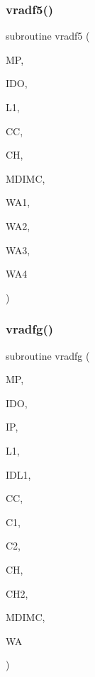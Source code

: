 \mbox{\label{sfft_8f_a0aec689c9487c752ec61e9d3692b2c12}} 
\subsubsection{\texorpdfstring{vradf5()}{vradf5()}}
{\footnotesize\ttfamily subroutine vradf5 (\begin{DoxyParamCaption}\item[{}]{MP,  }\item[{}]{I\+DO,  }\item[{}]{L1,  }\item[{dimension(mdimc,ido,l1,5)}]{CC,  }\item[{dimension(mdimc,ido,5,l1)}]{CH,  }\item[{}]{M\+D\+I\+MC,  }\item[{dimension(ido)}]{W\+A1,  }\item[{dimension(ido)}]{W\+A2,  }\item[{dimension(ido)}]{W\+A3,  }\item[{dimension(ido)}]{W\+A4 }\end{DoxyParamCaption})}

\mbox{\label{sfft_8f_a986cb0f6dcbd2acd1e2a4e9ef22d67c2}} 
\subsubsection{\texorpdfstring{vradfg()}{vradfg()}}
{\footnotesize\ttfamily subroutine vradfg (\begin{DoxyParamCaption}\item[{}]{MP,  }\item[{}]{I\+DO,  }\item[{}]{IP,  }\item[{}]{L1,  }\item[{}]{I\+D\+L1,  }\item[{dimension(mdimc,ido,ip,l1)}]{CC,  }\item[{dimension(mdimc,ido,l1,ip)}]{C1,  }\item[{dimension(mdimc,idl1,ip)}]{C2,  }\item[{dimension(mdimc,ido,l1,ip)}]{CH,  }\item[{dimension(mdimc,idl1,ip)}]{C\+H2,  }\item[{}]{M\+D\+I\+MC,  }\item[{dimension(ido)}]{WA }\end{DoxyParamCaption})}

